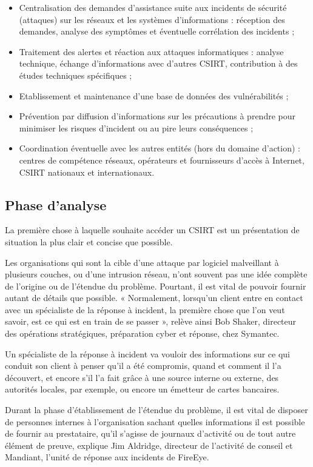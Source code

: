 \begin{itemize}
  \item Centralisation des demandes d’assistance suite aux incidents de sécurité (attaques) sur les réseaux et les systèmes d’informations : réception des demandes, analyse des symptômes et éventuelle corrélation des incidents ;
  \item Traitement des alertes et réaction aux attaques informatiques : analyse technique, échange d’informations avec d’autres CSIRT, contribution à des études techniques spécifiques ;
  \item Etablissement et maintenance d’une base de données des vulnérabilités ;
  \item Prévention par diffusion d’informations sur les précautions à prendre pour minimiser les risques d’incident ou au pire leurs conséquences ;
  \item Coordination éventuelle avec les autres entités (hors du domaine d’action) : centres de compétence réseaux, opérateurs et fournisseurs d’accès à Internet, CSIRT nationaux et internationaux.
\end{itemize}


 
 \subsection{Phase d'analyse}

La première chose à laquelle souhaite accéder un CSIRT est un présentation de situation la plus clair et concise  que possible.

 Les organisations qui sont la cible d’une attaque par logiciel malveillant à plusieurs couches, ou d’une intrusion réseau, n’ont souvent pas une idée complète de l’origine ou de l’étendue du problème. Pourtant, il est vital de pouvoir fournir autant de détails que possible. « Normalement, lorsqu’un client entre en contact avec un spécialiste de la réponse à incident, la première chose que l’on veut savoir, est ce qui est en train de se passer », relève ainsi Bob Shaker, directeur des opérations stratégiques, préparation cyber et réponse, chez Symantec.

Un spécialiste de la réponse à incident va vouloir des informations sur ce qui conduit son client à penser qu’il a été compromis, quand et comment il l’a découvert, et encore s’il l’a fait grâce à une source interne ou externe, des autorités locales, par exemple, ou encore un émetteur de cartes bancaires.

Durant la phase d’établissement de l’étendue du problème, il est vital de disposer de personnes internes à l’organisation sachant quelles informations il est possible de fournir au prestataire, qu’il s’agisse de journaux d’activité ou de tout autre élément de preuve, explique Jim Aldridge, directeur de l’activité de conseil et Mandiant, l’unité de réponse aux incidents de FireEye.

